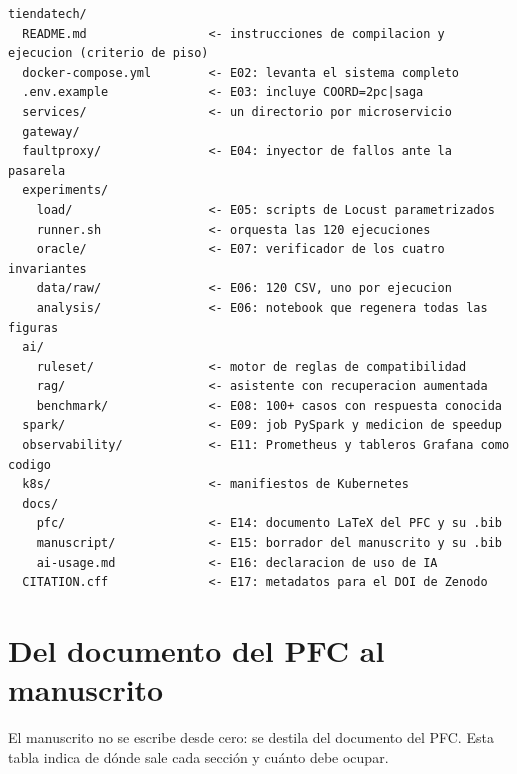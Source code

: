 \documentclass[11pt,a4paper]{article}
\begin{document}
\begin{lstlisting}
tiendatech/
  README.md                 <- instrucciones de compilacion y ejecucion (criterio de piso)
  docker-compose.yml        <- E02: levanta el sistema completo
  .env.example              <- E03: incluye COORD=2pc|saga
  services/                 <- un directorio por microservicio
  gateway/
  faultproxy/               <- E04: inyector de fallos ante la pasarela
  experiments/
    load/                   <- E05: scripts de Locust parametrizados
    runner.sh               <- orquesta las 120 ejecuciones
    oracle/                 <- E07: verificador de los cuatro invariantes
    data/raw/               <- E06: 120 CSV, uno por ejecucion
    analysis/               <- E06: notebook que regenera todas las figuras
  ai/
    ruleset/                <- motor de reglas de compatibilidad
    rag/                    <- asistente con recuperacion aumentada
    benchmark/              <- E08: 100+ casos con respuesta conocida
  spark/                    <- E09: job PySpark y medicion de speedup
  observability/            <- E11: Prometheus y tableros Grafana como codigo
  k8s/                      <- manifiestos de Kubernetes
  docs/
    pfc/                    <- E14: documento LaTeX del PFC y su .bib
    manuscript/             <- E15: borrador del manuscrito y su .bib
    ai-usage.md             <- E16: declaracion de uso de IA
  CITATION.cff              <- E17: metadatos para el DOI de Zenodo
\end{lstlisting}

\section{Del documento del PFC al manuscrito}

El manuscrito no se escribe desde cero: se destila del documento del PFC. Esta tabla indica de dónde sale cada sección y cuánto debe ocupar.
\end{document}
